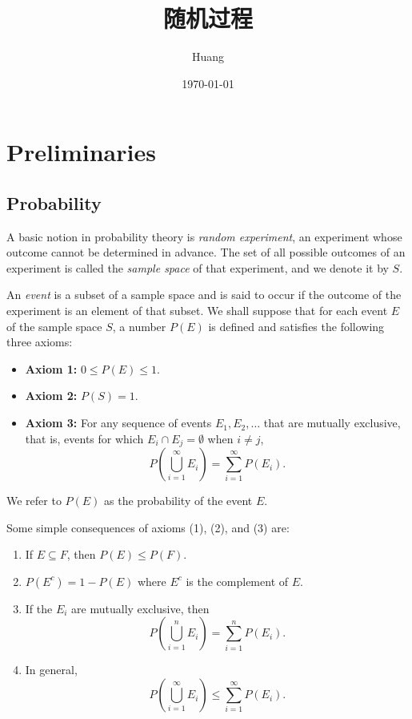 \documentclass[lang=cn,10pt]{elegantbook}
\title{随机过程}
\author{Huang}
\date{\today}
\begin{document}
	
	\maketitle
	\frontmatter
	
	\tableofcontents
	
	\mainmatter
	\chapter{Preliminaries}
	\section{Probability}
	A basic notion in probability theory is \textit{random experiment}, an experiment whose outcome cannot be determined in advance. The set of all possible outcomes of an experiment is called the \textit{sample space} of that experiment, and we denote it by \( S \).

An \textit{event} is a subset of a sample space and is said to occur if the outcome of the experiment is an element of that subset. We shall suppose that for each event \( E \) of the sample space \( S \), a number \( P(E) \) is defined and satisfies the following three axioms:

\begin{itemize}
    \item \textbf{Axiom 1:} \( 0 \leq P(E) \leq 1 \).
    \item \textbf{Axiom 2:} \( P(S) = 1 \).
    \item \textbf{Axiom 3:} For any sequence of events \( E_1, E_2, \dots \) that are mutually exclusive, that is, events for which \( E_i \cap E_j = \emptyset \) when \( i \neq j \), 
    \[
    P\left( \bigcup_{i=1}^{\infty} E_i \right) = \sum_{i=1}^{\infty} P(E_i).
    \]
\end{itemize}

We refer to \( P(E) \) as the probability of the event \( E \).

Some simple consequences of axioms (1), (2), and (3) are:

\begin{enumerate}
    \item If \( E \subseteq F \), then \( P(E) \leq P(F) \).
    \item \( P(E^c) = 1 - P(E) \) where \( E^c \) is the complement of \( E \).
    \item If the \( E_i \) are mutually exclusive, then
    \[
    P\left( \bigcup_{i=1}^{n} E_i \right) = \sum_{i=1}^{n} P(E_i).
    \]
    \item In general,
    \[
    P\left( \bigcup_{i=1}^{\infty} E_i \right) \leq \sum_{i=1}^{\infty} P(E_i).
    \]
\end{enumerate}
\end{document}
